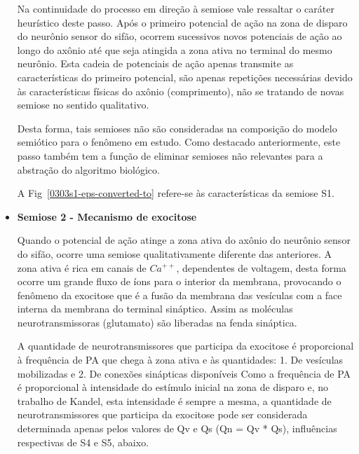 \begin{itemize}
	Na continuidade do processo em direção à semiose
	vale ressaltar o caráter heurístico deste passo. Após o primeiro potencial de ação na zona de disparo do neurônio sensor do sifão, ocorrem sucessivos novos potenciais de ação ao longo do axônio até que seja atingida a zona ativa no terminal do mesmo neurônio. Esta cadeia de potenciais de ação apenas transmite as características do primeiro potencial, são apenas repetições necessárias devido às características físicas do axônio (comprimento), não se tratando de novas semiose no sentido qualitativo.

	Desta forma, tais semioses não são consideradas na composição do modelo semiótico para o fenômeno em estudo. Como destacado anteriormente, este passo também tem a função de eliminar semioses não relevantes para a abstração do algoritmo biológico.

	A Fig~\ref{0303s1-eps-converted-to} refere-se às características da semiose S1.

	\item \textbf{Semiose 2 - Mecanismo de exocitose}


	Quando o potencial de ação atinge a zona ativa do axônio do neurônio sensor do sifão, ocorre uma semiose qualitativamente diferente das anteriores. A zona ativa é rica em canais de $Ca^{++}$, dependentes de voltagem, desta forma ocorre um grande fluxo de íons para o interior da membrana, provocando o fenômeno da exocitose que é a fusão da membrana das vesículas com a face interna da membrana do terminal sináptico. Assim as moléculas neurotransmissoras (glutamato) são liberadas na fenda sináptica.

	A quantidade de neurotransmissores
	que participa da exocitose é proporcional à frequência de PA que chega à zona ativa e às quantidades: 1. De vesículas mobilizadas
	e 2. De conexões sinápticas disponíveis
	Como a frequência de PA é proporcional à intensidade do estímulo inicial na zona de disparo e, no trabalho de Kandel, esta intensidade é sempre a mesma, a quantidade de neurotransmissores que participa da exocitose pode ser considerada determinada apenas pelos valores de Qv e Qs (Qn = Qv * Qs), influências respectivas de S4 e S5, abaixo.


\end{itemize}
